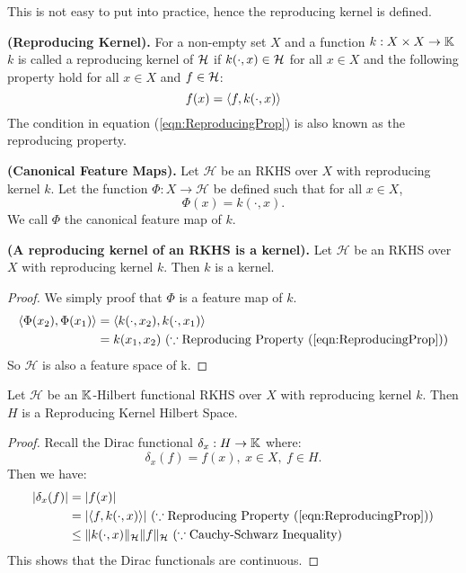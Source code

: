 \documentclass[twoside]{memoir}
\begin{document}
	This is not easy to put into practice, hence the reproducing kernel is defined.
	\begin{defn} \textbf{(Reproducing Kernel).}
		For a non-empty set $X$ and a function $k : X \times X \rightarrow \mathbb{K}$ $k$ is called a reproducing kernel of $\mathcal{H}$ if $k(\cdot, x) \in \mathcal{H}$ for all $x \in X$ and the following property hold for all $x \in X$ and $f \in \mathcal{H}$:
		\begin{equation} \label{eqn:ReproducingProp}
		f(x) = \langle f, k(\cdot, x)\rangle
		\end{equation}
		The condition in equation (\ref{eqn:ReproducingProp}) is also known as the reproducing property.
	\end{defn}
	\begin{defn} \label{def:CanFeatureMaps}
		\textbf{(Canonical Feature Maps).}
		Let $\mathcal{H}$ be an RKHS over $X$ with reproducing kernel $k$. Let the function $\Phi: X \rightarrow \mathcal{H}$ be defined such that for all $x \in X$,
		\[ \Phi(x) = k(\cdot, x). \]
		We call $\Phi$ the canonical feature map of $k$.
	\end{defn}
	\begin{lem}
		\textbf{(A reproducing kernel of an RKHS is a kernel).}
		Let $\mathcal{H}$ be an RKHS over $X$ with reproducing kernel $k$. Then $k$ is a kernel.
	\end{lem}
	\begin{proof}
		We simply proof that $\Phi$ is a feature map of $k$.
		\begin{equation*}
		\begin{split}
		\langle\Phi(x_2), \Phi(x_1)\rangle &= \langle k(\cdot, x_2), k(\cdot, x_1)\rangle \\
		&=  k(x_1, x_2) ~ (\because \text{Reproducing Property } (\ref{eqn:ReproducingProp}))
		\end{split}
		\end{equation*}
		So $\mathcal{H}$ is also a feature space of k.
	\end{proof}
	\begin{lem}
		Let $\mathcal{H}$ be an $\mathbb{K}$-Hilbert functional RKHS over $X$ with reproducing kernel $k$. Then $H$ is a Reproducing Kernel Hilbert Space.
	\end{lem}
	\begin{proof}
		Recall the Dirac functional $\delta_x: H \rightarrow \mathbb{K}$ where:
		\[ \delta_x(f) = f(x), ~ x \in X, ~ f \in H. \]
		Then we have:
		\begin{equation*}
		\begin{split}
		|\delta_x(f)| &= |f(x)| \\
		&= |\langle f, k(\cdot, x)\rangle| ~ (\because \text{Reproducing Property }(\ref{eqn:ReproducingProp})) \\
		&\leq \lVert k(\cdot, x)\rVert_\mathcal{H} \lVert f\rVert_
		\mathcal{H} ~ (\because \text{Cauchy-Schwarz Inequality}) \\
		\end{split}
		\end{equation*}
		This shows that the Dirac functionals are continuous.
	\end{proof}
	
\end{document}
